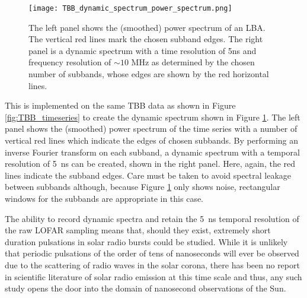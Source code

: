 \begin{figure}[ht]
\centering
\texttt{[image: TBB\_dynamic\_spectrum\_power\_spectrum.png]}
\caption[A dynamic spectrum generated with TBB data from I-LOFAR.]{The left panel shows the (smoothed) power spectrum of an LBA. The vertical red lines mark the chosen subband edges. The right panel is a dynamic spectrum with a time resolution of 5ns and frequency resolution of $\sim 10$ MHz as determined by the chosen number of subbands, whose edges are shown by the red horizontal lines.}
\label{fig:TBB_dynamicspectrum}
\end{figure}

This is implemented on the same TBB data as shown in Figure \ref{fig:TBB_timeseries} to create the dynamic spectrum shown in Figure \ref{fig:TBB_dynamicspectrum}. The left panel shows the (smoothed) power spectrum of the time series with a number of vertical red lines which indicate the edges of chosen subbands. By performing an inverse Fourier transform on each subband, a dynamic spectrum with a temporal resolution of 5~ns can be created, shown in the right panel. Here, again, the red lines indicate the subband edges. Care must be taken to avoid spectral leakage between subbands although, because Figure \ref{fig:TBB_dynamicspectrum} only shows noise, rectangular windows for the subbands are appropriate in this case.
 
The ability to record dynamic spectra and retain the 5~ns temporal resolution of the raw LOFAR sampling means that, should they exist, extremely short duration pulsations in solar radio bursts could be studied. While it is unlikely that periodic pulsations of the order of tens of nanoseconds will ever be observed due to the scattering of radio waves in the solar corona, there has been no report in scientific literature of solar radio emission at this time scale and thus, any such study opens the door into the domain of nanosecond observations of the Sun.

